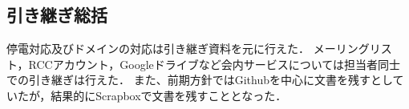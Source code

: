 \subsection*{引き継ぎ総括}


停電対応及びドメインの対応は引き継ぎ資料を元に行えた．
メーリングリスト，RCCアカウント，Googleドライブなど会内サービスについては担当者同士での引き継ぎは行えた．
また、前期方針ではGithubを中心に文書を残すとしていたが，結果的にScrapboxで文書を残すこととなった．
